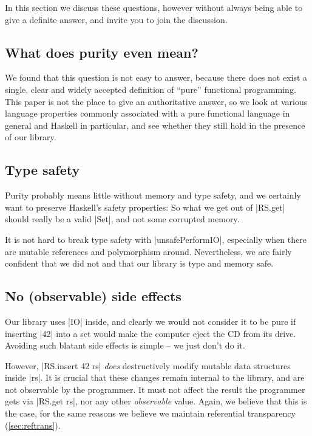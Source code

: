 \documentclass[manuscript,screen,acmsmall,nonacm]{acmart}
\begin{document}
In this section we discuss these questions, however without always being able to give a definite answer, and invite you to join the discussion.

\subsection{What does purity even mean?}

We found that this question is not easy to answer, because there does not exist a single, clear and widely accepted definition of “pure” functional programming.
This paper is not the place to give an authoritative answer, so we look at various language properties commonly associated with a pure functional language in general and Haskell in particular,
and see whether they still hold in the presence of our library.

\subsection{Type safety}

Purity probably means little without memory and type safety, and we certainly want to preserve Haskell's safety properties: So what we get out of |RS.get| should really be a valid |Set|, and not some corrupted memory.

It is not hard to break type safety with |unsafePerformIO|, especially when there are mutable references and polymorphism around. Nevertheless, we are fairly confident that we did not and that our library is type and memory safe.

\subsection{No (observable) side effects}

Our library uses |IO| inside, and clearly we would not consider it to be pure if inserting |42| into a set would make the computer eject the CD from its drive. Avoiding such blatant side effects is simple -- we just don't do it.

However, |RS.insert 42 rs| \emph{does} destructively modify mutable data structures inside |rs|. It is crucial that these changes remain internal to the library, and are not observable by the programmer. It must not affect the result the programmer gets via |RS.get rs|, nor any other \emph{observable} value. Again, we believe that this is the case, for the same reasons we believe we maintain referential transparency (\cref{sec:reftrans}).
\end{document}
